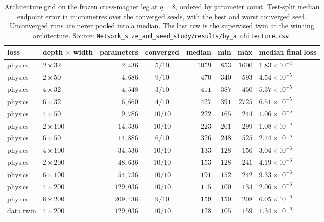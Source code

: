 \documentclass[11pt,a4paper]{article}
\begin{document}
\begin{table}[tbp]
  \centering
  \caption{Architecture grid on the frozen cross-magnet leg at $q = 8$, ordered
  by parameter count. Test-split median endpoint error in micrometres over the
  converged seeds, with the best and worst converged seed. Unconverged runs are
  never pooled into a median. The last row is the supervised twin at the winning
  architecture. Source:
  \texttt{Network\_size\_and\_seed\_study/results/by\_architecture.csv}.}
  \label{tab:grid}
  \small
  \begin{tabular}{llrcrrrl}
    \toprule
    loss & depth $\times$ width & parameters & converged & median & min & max
      & median final loss \\
    \midrule
    physics & $2 \times 32$  & $2{,}436$   & $5/10$  & $1059$ & $853$ & $1600$ & $1.83\times10^{-4}$ \\
    physics & $2 \times 50$  & $4{,}686$   & $9/10$  & $470$  & $340$ & $593$  & $4.54\times10^{-5}$ \\
    physics & $4 \times 32$  & $4{,}548$   & $3/10$  & $411$  & $387$ & $450$  & $5.37\times10^{-5}$ \\
    physics & $6 \times 32$  & $6{,}660$   & $4/10$  & $427$  & $391$ & $2725$ & $6.51\times10^{-5}$ \\
    physics & $4 \times 50$  & $9{,}786$   & $10/10$ & $222$  & $165$ & $244$  & $1.06\times10^{-5}$ \\
    physics & $2 \times 100$ & $14{,}336$  & $10/10$ & $223$  & $201$ & $299$  & $1.08\times10^{-5}$ \\
    physics & $6 \times 50$  & $14{,}886$  & $6/10$  & $326$  & $248$ & $525$  & $2.74\times10^{-5}$ \\
    physics & $4 \times 100$ & $34{,}536$  & $10/10$ & $133$  & $128$ & $156$  & $3.04\times10^{-6}$ \\
    physics & $2 \times 200$ & $48{,}636$  & $10/10$ & $153$  & $128$ & $241$  & $4.19\times10^{-6}$ \\
    physics & $6 \times 100$ & $54{,}736$  & $10/10$ & $191$  & $152$ & $242$  & $9.33\times10^{-6}$ \\
    physics & $4 \times 200$ & $129{,}036$ & $10/10$ & $115$  & $100$ & $134$  & $2.06\times10^{-6}$ \\
    physics & $6 \times 200$ & $209{,}436$ & $9/10$  & $159$  & $150$ & $208$  & $6.05\times10^{-6}$ \\
    \midrule
    data twin & $4 \times 200$ & $129{,}036$ & $10/10$ & $128$ & $105$ & $159$ & $1.34\times10^{-6}$ \\
    \bottomrule
  \end{tabular}
\end{table}
\end{document}
